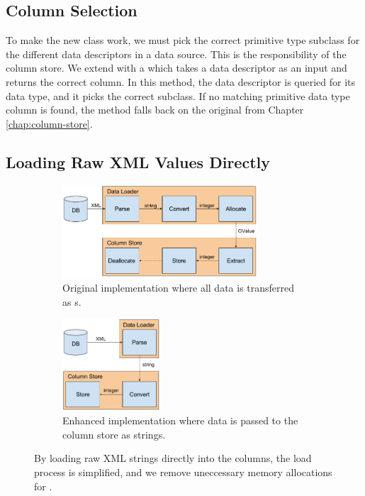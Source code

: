 \subsection{Column Selection}
\label{sub:Column Selection}
To make the new  class work, we must pick the correct primitive type subclass for the different data descriptors in a data source. This is the responsibility of the column store. We extend  with a  which takes a data descriptor as an input and returns the correct column. In this method, the data descriptor is queried for its data type, and it picks the correct  subclass. If no matching primitive data type column is found, the method falls back on the original  from Chapter \ref{chap:column-store}.

\subsection{Loading Raw XML Values Directly}
\label{storage-format:raw-xml}
\begin{figure}
    \centering
    \begin{subfigure}{\textwidth}
        \centering
        \includegraphics[width=0.8\textwidth]{img/gap-load-original.png}
        \caption{Original implementation where all data is transferred as s.}
    \end{subfigure}
    \begin{subfigure}{\textwidth}
        \centering
        \includegraphics[width=0.4\textwidth]{img/gap-load-raw.png}
        \caption{Enhanced implementation where data is passed to the column store as strings.}
    \end{subfigure}
\caption{By loading raw XML strings directly into the columns, the load process is simplified, and we remove uneccessary memory allocations for .}
\label{fig:gap-load-raw}
\end{figure}

